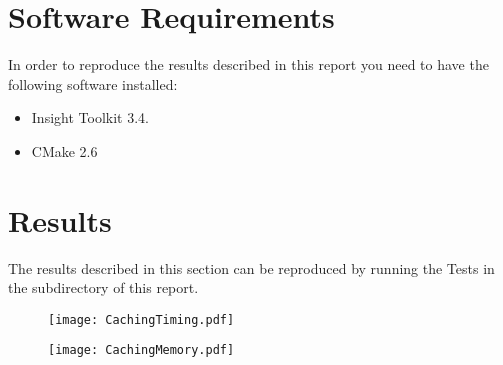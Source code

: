\documentclass{InsightArticle}
\begin{document}
\section{Software Requirements}

In order to reproduce the results described in this report you need to have the
following software installed:

\begin{itemize}
  \item  Insight Toolkit 3.4.
  \item  CMake 2.6
\end{itemize}


\appendix

\section{Results}

The results described in this section can be reproduced by running the Tests in
the  subdirectory of this report.

\begin{figure}[ht]
\centering
\texttt{[image: CachingTiming.pdf]}
\end{figure}

\begin{figure}[ht]
\centering
\texttt{[image: CachingMemory.pdf]}
\end{figure}


\end{document}
